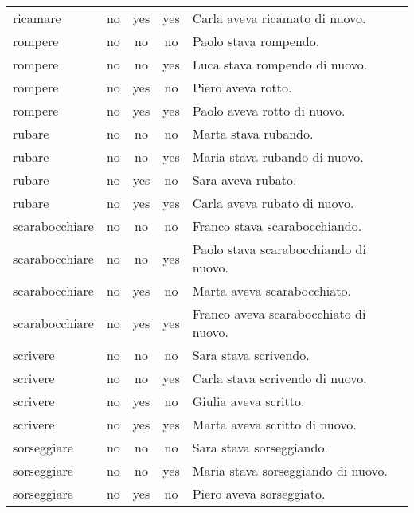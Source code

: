 \begin{longtable}{l|ccc|p{5cm}}
ricamare       & no   & yes        & yes       & Carla aveva ricamato di nuovo.        \\
rompere        & no   & no         & no        & Paolo stava rompendo.                 \\
rompere        & no   & no         & yes       & Luca stava rompendo di nuovo.         \\
rompere        & no   & yes        & no        & Piero aveva rotto.                    \\
rompere        & no   & yes        & yes       & Paolo aveva rotto di nuovo.           \\
rubare         & no   & no         & no        & Marta stava rubando.                  \\
rubare         & no   & no         & yes       & Maria stava rubando di nuovo.         \\
rubare         & no   & yes        & no        & Sara aveva rubato.                    \\
rubare         & no   & yes        & yes       & Carla aveva rubato di nuovo.          \\
scarabocchiare & no   & no         & no        & Franco stava scarabocchiando.         \\
scarabocchiare & no   & no         & yes       & Paolo stava scarabocchiando di nuovo. \\
scarabocchiare & no   & yes        & no        & Marta aveva scarabocchiato.           \\
scarabocchiare & no   & yes        & yes       & Franco aveva scarabocchiato di nuovo. \\
scrivere       & no   & no         & no        & Sara stava scrivendo.                 \\
scrivere       & no   & no         & yes       & Carla stava scrivendo di nuovo.       \\
scrivere       & no   & yes        & no        & Giulia aveva scritto.                 \\
scrivere       & no   & yes        & yes       & Marta aveva scritto di nuovo.         \\
sorseggiare    & no   & no         & no        & Sara stava sorseggiando.              \\
sorseggiare    & no   & no         & yes       & Maria stava sorseggiando di nuovo.    \\
sorseggiare    & no   & yes        & no        & Piero aveva sorseggiato.              \\

\end{longtable}
